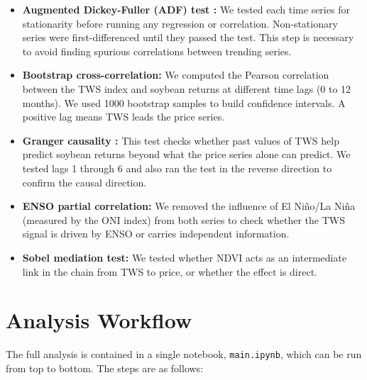 \documentclass[6pt, twocolumn]{article}
\begin{document}
\begin{itemize}
  \item \textbf{Augmented Dickey-Fuller (ADF) test \cite{dickey1979distribution}:} We tested each
        time series for stationarity before running any regression
        or correlation. Non-stationary series were first-differenced
        until they passed the test. This step is necessary to avoid
        finding spurious correlations between trending series.
  \item \textbf{Bootstrap cross-correlation:} We computed the
        Pearson correlation between the TWS index and soybean
        returns at different time lags (0 to 12 months). We used
        1000 bootstrap samples to build confidence intervals.
        A positive lag means TWS leads the price series.
  \item \textbf{Granger causality \cite{granger1969investigating}:} This test checks whether past
        values of TWS help predict soybean returns beyond what the
        price series alone can predict. We tested lags 1 through 6
        and also ran the test in the reverse direction to confirm
        the causal direction.
  \item \textbf{ENSO partial correlation:} We removed the influence
        of El Niño/La Niña (measured by the ONI index) from both
        series to check whether the TWS signal is driven by ENSO
        or carries independent information.
  \item \textbf{Sobel mediation test:} We tested whether NDVI acts
        as an intermediate link in the chain from TWS to price, or
        whether the effect is direct.
\end{itemize}

\FloatBarrier
\section{Analysis Workflow}
\label{sec:workflow}

The full analysis is contained in a single notebook,
\texttt{main.ipynb}, which can be run from top to bottom. The steps
are as follows:
\end{document}
